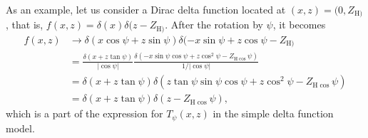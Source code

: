 \documentclass[12pt,letterpaper]{article}
\newcommand{\zh}[1]{Z_{\mathrm{H}#1}}
\begin{document}
As an 
example, let us consider a Dirac delta function located at $(x,z)=(0,\zh)$,
that is, $f(x,z)=\delta(x)\delta(z-\zh)$. After the rotation by $\psi$, it 
becomes
\begin{align*}
  f(x,z) 
  &\rightarrow 
    \delta(x\cos\psi+z\sin\psi) \delta(-x\sin\psi+z\cos\psi-\zh) \\
  &= \frac{\delta(x+z\tan\psi)}{|\cos\psi|}
     \frac{\delta(-x\sin\psi\cos\psi+z\cos^2\psi-\zh\cos\psi)}{1/|\cos\psi|} \\
  &= \delta(x+z\tan\psi)\delta(z\tan\psi\sin\psi\cos\psi+z\cos^2\psi-\zh\cos\psi) \\
  &= \delta(x+z\tan\psi)\delta(z-\zh\cos\psi),
\end{align*}
which is a part of the expression for $T_\psi(x,z)$ in the simple delta 
function model.



\end{document}
